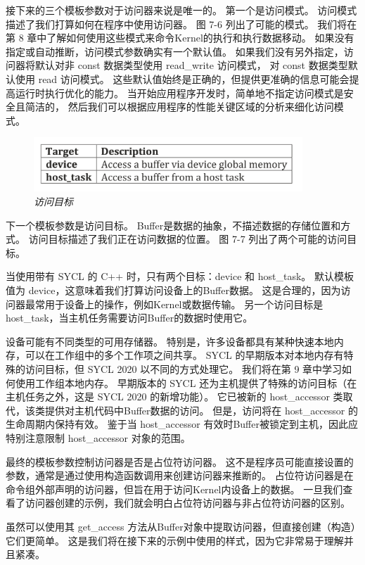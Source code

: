 接下来的三个模板参数对于访问器来说是唯一的。 第一个是访问模式。 访问模式描述了我们打算如何在程序中使用访问器。 
图 7-6 列出了可能的模式。 我们将在第 8 章中了解如何使用这些模式来命令Kernel的执行和执行数据移动。
如果没有指定或自动推断，访问模式参数确实有一个默认值。 
如果我们没有另外指定，访问器将默认对非 const 数据类型使用 read\_write 访问模式，
对 const 数据类型默认使用 read 访问模式。 
这些默认值始终是正确的，但提供更准确的信息可能会提高运行时执行优化的能力。 
当开始应用程序开发时，简单地不指定访问模式是安全且简洁的，
然后我们可以根据应用程序的性能关键区域的分析来细化访问模式。

\begin{figure}[H]
	\centering
	\includegraphics[width=0.9\textwidth]{figs/F7.7.png}
	\caption{\textit{访问目标 }}
\end{figure}

下一个模板参数是访问目标。 Buffer是数据的抽象，不描述数据的存储位置和方式。 
访问目标描述了我们正在访问数据的位置。 图 7-7 列出了两个可能的访问目标。

当使用带有 SYCL 的 C++ 时，只有两个目标：device 和 host\_task。 
默认模板值为 device，这意味着我们打算访问设备上的Buffer数据。 
这是合理的，因为访问器最常用于设备上的操作，例如Kernel或数据传输。 
另一个访问目标是 host\_task，当主机任务需要访问Buffer的数据时使用它。

设备可能有不同类型的可用存储器。 特别是，许多设备都具有某种快速本地内存，可以在工作组中的多个工作项之间共享。 
SYCL 的早期版本对本地内存有特殊的访问目标，但 SYCL 2020 以不同的方式处理它。 
我们将在第 9 章中学习如何使用工作组本地内存。
早期版本的 SYCL 还为主机提供了特殊的访问目标（在主机任务之外，这是 SYCL 2020 的新增功能）。 
它已被新的 host\_accessor 类取代，该类提供对主机代码中Buffer数据的访问。 
但是，访问将在 host\_accessor 的生命周期内保持有效。 
鉴于当 host\_accessor 有效时Buffer被锁定到主机，因此应特别注意限制 host\_accessor 对象的范围。

最终的模板参数控制访问器是否是占位符访问器。 
这不是程序员可能直接设置的参数，通常是通过使用构造函数调用来创建访问器来推断的。 
占位符访问器是在命令组外部声明的访问器，但旨在用于访问Kernel内设备上的数据。 
一旦我们查看了访问器创建的示例，我们就会明白占位符访问器与非占位符访问器的区别。

虽然可以使用其 get\_access 方法从Buffer对象中提取访问器，但直接创建（构造）它们更简单。 
这是我们将在接下来的示例中使用的样式，因为它非常易于理解并且紧凑。

